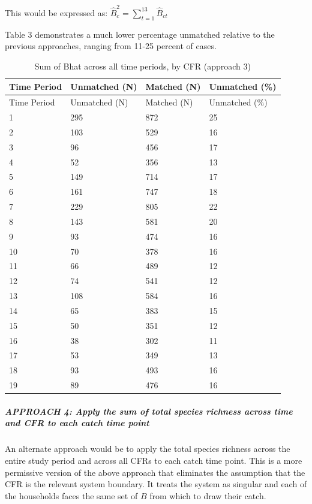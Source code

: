 \documentclass[
]{article}
\begin{document}
This would be expressed as:
\(\hat{B}_{c}^2 = \sum_{t=1}^{13} \hat{B}_{ct}\)

Table 3 demonstrates a much lower percentage unmatched relative to the
previous approaches, ranging from 11-25 percent of cases.

\begin{longtable}[]{@{}llll@{}}
\caption{Sum of Bhat across all time periods, by CFR (approach
3)}\tabularnewline
\toprule
Time Period & Unmatched (N) & Matched (N) & Unmatched (\%) \\
\midrule
\endfirsthead
\toprule
Time Period & Unmatched (N) & Matched (N) & Unmatched (\%) \\
\midrule
\endhead
1 & 295 & 872 & 25 \\
2 & 103 & 529 & 16 \\
3 & 96 & 456 & 17 \\
4 & 52 & 356 & 13 \\
5 & 149 & 714 & 17 \\
6 & 161 & 747 & 18 \\
7 & 229 & 805 & 22 \\
8 & 143 & 581 & 20 \\
9 & 93 & 474 & 16 \\
10 & 70 & 378 & 16 \\
11 & 66 & 489 & 12 \\
12 & 74 & 541 & 12 \\
13 & 108 & 584 & 16 \\
14 & 65 & 383 & 15 \\
15 & 50 & 351 & 12 \\
16 & 38 & 302 & 11 \\
17 & 53 & 349 & 13 \\
18 & 93 & 493 & 16 \\
19 & 89 & 476 & 16 \\
\bottomrule
\end{longtable}

\hfill\break
\hfill\break

\hypertarget{approach-4-apply-the-sum-of-total-species-richness-across-time-and-cfr-to-each-catch-time-point}{%
\subparagraph{\texorpdfstring{\textbf{APPROACH 4: Apply the sum of total
species richness across time and CFR to each catch time
point}}{APPROACH 4: Apply the sum of total species richness across time and CFR to each catch time point}}\label{approach-4-apply-the-sum-of-total-species-richness-across-time-and-cfr-to-each-catch-time-point}}

\hfill\break
\hfill\break
An alternate approach would be to apply the total species richness
across the entire study period and across all CFRs to each catch time
point. This is a more permissive version of the above approach that
eliminates the assumption that the CFR is the relevant system boundary.
It treats the system as singular and each of the households faces the
same set of \(B\) from which to draw their catch.
\end{document}
